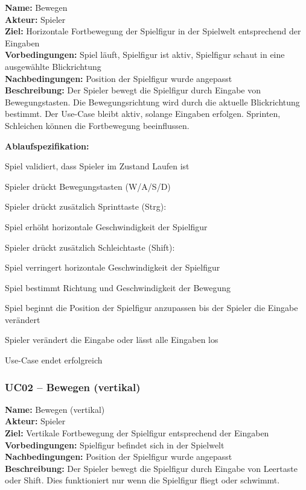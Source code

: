 \documentclass{article}
\newcommand{\opt}{\ensuremath{\parallel}}
\begin{document}
\textbf{Name:} Bewegen \\
\textbf{Akteur:} Spieler \\
\textbf{Ziel:} Horizontale Fortbewegung der Spielfigur in der Spielwelt entsprechend der Eingaben \\
\textbf{Vorbedingungen:} Spiel läuft, Spielfigur ist aktiv, Spielfigur schaut in eine ausgewählte Blickrichtung \\
\textbf{Nachbedingungen:} Position der Spielfigur wurde angepasst \\
\textbf{Beschreibung:} Der Spieler bewegt die Spielfigur durch Eingabe von Bewegungstasten. Die Bewegungsrichtung wird durch die aktuelle Blickrichtung bestimmt. Der Use-Case bleibt aktiv, solange Eingaben erfolgen. Sprinten, Schleichen können die Fortbewegung beeinflussen.

\textbf{Ablaufspezifikation:}
\begin{description}[style=nextline,leftmargin=1.9cm,labelwidth=1.6cm]
  \item[1.] Spiel validiert, dass Spieler im Zustand Laufen ist
  \item[2.] Spieler drückt Bewegungstasten (W/A/S/D)
  \item[2\opt a.] Spieler drückt zusätzlich Sprinttaste (Strg):
  \item[2\opt a.1.] Spiel erhöht horizontale Geschwindigkeit der Spielfigur
  \item[2\opt b.] Spieler drückt zusätzlich Schleich\-taste (Shift):
  \item[2\opt b.1.] Spiel verringert horizontale Geschwindigkeit der Spielfigur
  \item[3.] Spiel bestimmt Richtung und Geschwindigkeit der Bewegung
  \item[4.] Spiel beginnt die Position der Spielfigur anzupassen bis der Spieler die Eingabe verändert
  \item[5.] Spieler verändert die Eingabe oder lässt alle Eingaben los
  \item[6.] Use-Case endet erfolgreich
\end{description}

\subsubsection*{UC02 – Bewegen (vertikal)}

\textbf{Name:} Bewegen (vertikal) \\
\textbf{Akteur:} Spieler \\
\textbf{Ziel:} Vertikale Fortbewegung der Spielfigur entsprechend der Eingaben  \\
\textbf{Vorbedingungen:} Spielfigur befindet sich in der Spielwelt \\
\textbf{Nachbedingungen:} Position der Spielfigur wurde angepasst \\
\textbf{Beschreibung:} Der Spieler bewegt die Spielfigur durch Eingabe von Leertaste oder Shift. Dies funktioniert nur wenn die Spielfigur fliegt oder schwimmt.
\end{document}
